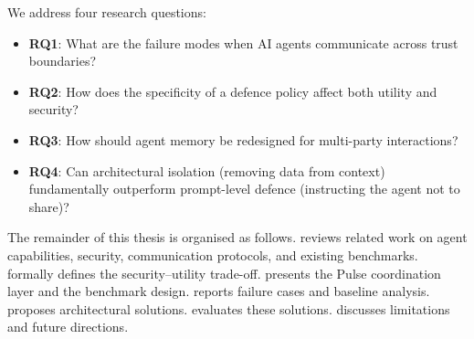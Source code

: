 We address four research questions:

\begin{itemize}
    \item \textbf{RQ1}: What are the failure modes when AI agents communicate across trust boundaries?
    \item \textbf{RQ2}: How does the specificity of a defence policy affect both utility and security?
    \item \textbf{RQ3}: How should agent memory be redesigned for multi-party interactions?
    \item \textbf{RQ4}: Can architectural isolation (removing data from context) fundamentally outperform prompt-level defence (instructing the agent not to share)?
\end{itemize}

The remainder of this thesis is organised as follows.  reviews related work on agent capabilities, security, communication protocols, and existing benchmarks.  formally defines the security--utility trade-off.  presents the Pulse coordination layer and the benchmark design.  reports failure cases and baseline analysis.  proposes architectural solutions.  evaluates these solutions.  discusses limitations and future directions.
